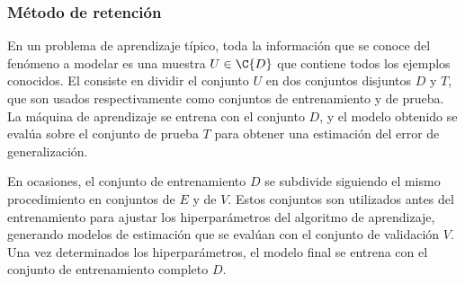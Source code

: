 %
\subsubsection{Método de retención}
\label{retencion}
%
En un problema de aprendizaje típico, toda la información que se
conoce del fenómeno a modelar es una muestra $U\in\C{D}$ que contiene
todos los ejemplos conocidos.
El  consiste en dividir el conjunto $U$ en dos
conjuntos disjuntos $D$ y $T$, que son usados respectivamente como
conjuntos de entrenamiento y de prueba.
La máquina de aprendizaje se entrena con el conjunto $D$, y el modelo
obtenido se evalúa sobre el conjunto de prueba $T$ para obtener una
estimación del error de generalización.

En ocasiones, el conjunto de entrenamiento $D$ se subdivide siguiendo
el mismo procedimiento en conjuntos de  $E$ y
de  $V$.
Estos conjuntos son utilizados antes del entrenamiento para ajustar
los hiperparámetros del algoritmo de aprendizaje, generando modelos
de estimación que se evalúan con el conjunto de validación $V$.
Una vez determinados los hiperparámetros, el modelo final se 
entrena con el conjunto de entrenamiento completo $D$.
